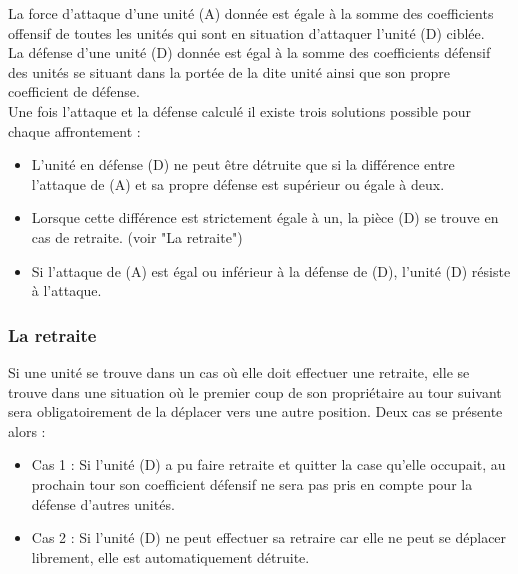     La force d'attaque d'une unité (A) donnée est égale à la somme des coefficients offensif de toutes les unités qui sont en situation d'attaquer l'unité (D) ciblée.\\
	  
    La défense d'une unité (D) donnée est égal à la somme des coefficients défensif des unités se situant dans la portée de la dite unité ainsi que son propre coefficient de défense.\\
    
    Une fois l'attaque et la défense calculé il existe trois solutions possible pour chaque affrontement :

	\begin{itemize}
    \renewcommand{\labelitemi}{$\bullet$}
	\item L'unité en défense (D) ne peut être détruite que si la différence entre l'attaque de (A) et sa propre défense est supérieur ou égale à deux.
    
	\item Lorsque cette différence est strictement égale à un, la pièce (D) se trouve en cas de retraite. (voir "La retraite")
	
	\item Si l'attaque de (A) est égal ou inférieur à la défense de (D), l'unité (D) résiste à l'attaque.\\    
    
    \end{itemize}

	\subsubsection*{La retraite}

	Si une unité se trouve dans un cas où elle doit effectuer une retraite, elle se trouve dans une situation où le premier coup de son propriétaire au tour suivant sera obligatoirement de la déplacer vers une autre position. Deux cas se présente alors :
   
   
   \begin{itemize}
   \renewcommand{\labelitemi}{$\bullet$}
	\item Cas 1 : Si l'unité (D) a pu faire retraite et quitter la case qu'elle occupait, au prochain tour son coefficient défensif ne sera pas pris en compte pour la défense d'autres unités.\\
	
 	\item Cas 2 : Si l'unité (D) ne peut effectuer sa retraire car elle ne peut se déplacer librement, elle est automatiquement détruite.\\
	  \end{itemize} 
    

